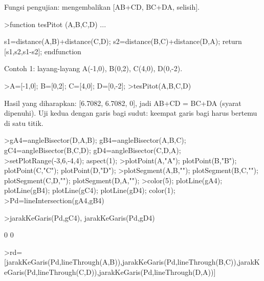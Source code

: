 \documentclass[a4paper,10pt]{article}
\begin{document}
\begin{eulernotebook}
\begin{eulercomment}
\begin{eulercomment}
\begin{eulercomment}
\begin{eulercomment}
\begin{eulercomment}
\begin{eulercomment}
\begin{eulercomment}
\begin{eulercomment}
\begin{eulercomment}
\begin{eulercomment}
\begin{eulercomment}
\begin{eulercomment}
\begin{eulercomment}
\begin{eulercomment}
\begin{eulercomment}
\begin{eulercomment}
\begin{eulercomment}
\begin{eulercomment}
\begin{eulercomment}
\begin{eulercomment}
\begin{eulercomment}
Fungsi pengujian: mengembalikan [AB+CD, BC+DA, selisih].
\end{eulercomment}
\begin{eulerprompt}
>function tesPitot (A,B,C,D) ...
\end{eulerprompt}
\begin{eulerudf}
    s1=distance(A,B)+distance(C,D);
    s2=distance(B,C)+distance(D,A);
    return [s1,s2,s1-s2];
  endfunction
\end{eulerudf}
\begin{eulercomment}
Contoh 1: layang-layang A(-1,0), B(0,2), C(4,0), D(0,-2).
\end{eulercomment}
\begin{eulerprompt}
>A=[-1,0]; B=[0,2]; C=[4,0]; D=[0,-2];
>tesPitot(A,B,C,D)
\end{eulerprompt}
\begin{euleroutput}
  [6.7082,  6.7082,  0]
\end{euleroutput}
\begin{eulercomment}
Hasil yang diharapkan: [6.7082, 6.7082, 0], jadi AB+CD = BC+DA (syarat dipenuhi).
Uji kedua dengan garis bagi sudut: keempat garis bagi harus bertemu di satu titik.
\end{eulercomment}
\begin{eulerprompt}
>gA4=angleBisector(D,A,B); gB4=angleBisector(A,B,C); gC4=angleBisector(B,C,D); gD4=angleBisector(C,D,A);
>setPlotRange(-3,6,-4,4); aspect(1);
>plotPoint(A,"A"); plotPoint(B,"B"); plotPoint(C,"C"); plotPoint(D,"D");
>plotSegment(A,B,""); plotSegment(B,C,""); plotSegment(C,D,""); plotSegment(D,A,"");
>color(5); plotLine(gA4); plotLine(gB4); plotLine(gC4); plotLine(gD4); color(1);
>Pd=lineIntersection(gA4,gB4)
\end{eulerprompt}
\begin{euleroutput}
  [0.666667,  0]
\end{euleroutput}
\begin{eulerprompt}
>jarakKeGaris(Pd,gC4), jarakKeGaris(Pd,gD4)
\end{eulerprompt}
\begin{euleroutput}
  0
  0
\end{euleroutput}
\begin{eulerprompt}
>rd=[jarakKeGaris(Pd,lineThrough(A,B)),jarakKeGaris(Pd,lineThrough(B,C)),jarakKeGaris(Pd,lineThrough(C,D)),jarakKeGaris(Pd,lineThrough(D,A))]
\end{eulerprompt}

\end{eulercomment}
\end{eulercomment}
\end{eulercomment}
\end{eulercomment}
\end{eulercomment}
\end{eulercomment}
\end{eulercomment}
\end{eulercomment}
\end{eulercomment}
\end{eulercomment}
\end{eulercomment}
\end{eulercomment}
\end{eulercomment}
\end{eulercomment}
\end{eulercomment}
\end{eulercomment}
\end{eulercomment}
\end{eulercomment}
\end{eulercomment}
\end{eulercomment}
\end{eulernotebook}
\end{document}
